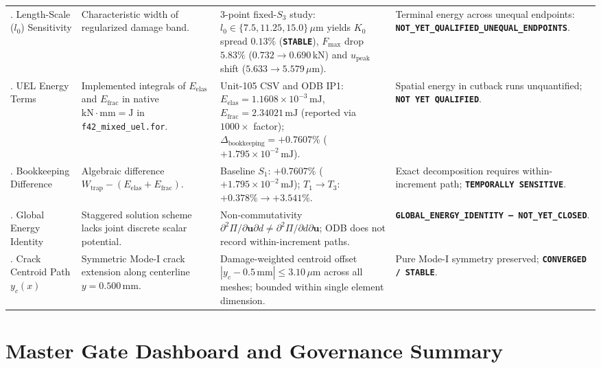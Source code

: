 \begin{table}[htbp]
\begin{tabularx}{\textwidth}{p{2.2cm}p{3.5cm}p{4.2cm}X}
\addlinespace
6. Length-Scale ($l_0$) Sensitivity & Characteristic width of regularized damage band. & 3-point fixed-$S_3$ study: $l_0 \in \{7.5, 11.25, 15.0\}\,\mu\text{m}$ yields $K_0$ spread $0.13\%$ (\textbf{\texttt{STABLE}}), $F_{\max}$ drop $5.83\%$ ($0.732 \to 0.690\,\text{kN}$) and $u_{\mathrm{peak}}$ shift ($5.633 \to 5.579\,\mu\text{m}$). & Terminal energy across unequal endpoints: \textbf{\texttt{NOT\_YET\_QUALIFIED\_UNEQUAL\_ENDPOINTS}}. \\
\addlinespace
7. UEL Energy Terms & Implemented integrals of $E_{\mathrm{elas}}$ and $E_{\mathrm{frac}}$ in native $\mathrm{kN\cdot mm} = \mathrm{J}$ in \nolinkurl{f42_mixed_uel.for}. & Unit-105 CSV and ODB IP1: $E_{\mathrm{elas}} = 1.1608\times 10^{-3}\,\mathrm{mJ}$, $E_{\mathrm{frac}} = 2.34021\,\mathrm{mJ}$ (reported via $1000\times$ factor); $\Delta_{\mathrm{bookkeeping}} = +0.7607\%$ ($+1.795\times 10^{-2}\,\mathrm{mJ}$). & Spatial energy in cutback runs unquantified; \textbf{\texttt{NOT YET QUALIFIED}}. \\
\addlinespace
8. Bookkeeping Difference & Algebraic difference $W_{\mathrm{trap}} - (E_{\mathrm{elas}} + E_{\mathrm{frac}})$. & Baseline $S_1$: $+0.7607\%$ ($+1.795\times 10^{-2}\,\mathrm{mJ}$); $T_1 \to T_3$: $+0.378\% \to +3.541\%$. & Exact decomposition requires within-increment path; \textbf{\texttt{TEMPORALLY SENSITIVE}}. \\
\addlinespace
9. Global Energy Identity & Staggered solution scheme lacks joint discrete scalar potential. & Non-commutativity $\partial^2 \Pi / \partial \mathbf{u} \partial d \ne \partial^2 \Pi / \partial d \partial \mathbf{u}$; ODB does not record within-increment paths. & \textbf{\texttt{GLOBAL\_ENERGY\_IDENTITY --- NOT\_YET\_CLOSED}}. \\
\addlinespace
10. Crack Centroid Path $y_c(x)$ & Symmetric Mode-I crack extension along centerline $y = 0.500\,\text{mm}$. & Damage-weighted centroid offset $|y_c - 0.5\,\text{mm}| \le 3.10\,\mu\text{m}$ across all meshes; bounded within single element dimension. & Pure Mode-I symmetry preserved; \textbf{\texttt{CONVERGED / STABLE}}. \\
\bottomrule
\end{tabularx}
\end{table}

\section{Master Gate Dashboard and Governance Summary}
\label{sec:synthesis_gate_dashboard}

